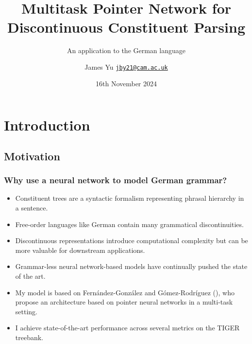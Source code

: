 \documentclass[8pt,handout]{beamer}
\date[16/11/24]{16th November 2024}
\title[Discontinuous Constituent Parsing]{Multitask Pointer Network for Discontinuous Constituent Parsing}
\subtitle[An application to German]{An application to the German language}
\author[J. Yu]{James Yu \newline \href{mailto:jby21@cam.ac.uk}{\texttt{jby21@cam.ac.uk}}}
\institute[Cambridge]{Department of Engineering \\ University of Cambridge}
\theoremstyle{definition}
\theoremstyle{plain}
\theoremstyle{definition}
\theoremstyle{remark}
\numberwithin{equation}{section}
\numberwithin{figure}{section}
\numberwithin{table}{section}
\begin{document}
\begin{frame}
    \titlepage
\end{frame}

\section{Introduction}
\subsection{Motivation}
\begin{frame}
    \frametitle{Why use a neural network to model German grammar?}
    \begin{itemize}
        \item Constituent trees are a syntactic formalism representing phrasal hierarchy in a sentence.

        \item Free-order languages like German contain many grammatical discontinuities.

        \item Discontinuous representations introduce computational complexity but can be more valuable for downstream applications.
        
        \item Grammar-less neural network-based models have continually pushed the state of the art.

        \item My model is based on Fernández-González and Gómez-Rodríguez (\citeyear{fernandez2022multitask2}), who propose an architecture based on pointer neural networks in a multi-task setting.

        \item I achieve state-of-the-art performance across several metrics on the TIGER treebank.
    \end{itemize}
\end{frame}
\end{document}
